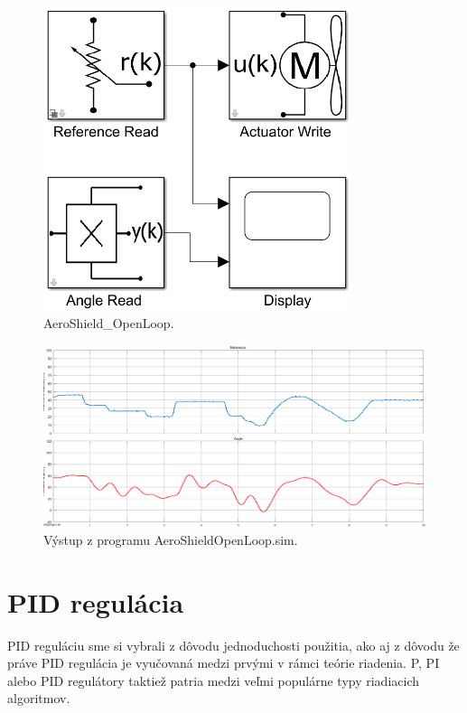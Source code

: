 \begin{figure}[!tbh]
	\centering
	\includegraphics[width=90mm]{obr/AeroOpenLoop.png}
	\caption{AeroShield\_OpenLoop.}\label{OBRAZOK 2.6.111}
\end{figure}

\begin{figure}[!tbh]
	\centering
	\includegraphics[width=120mm]{obr/SSmulinkOpenloop.png}
	\caption{Výstup z programu AeroShieldOpenLoop.sim.}\label{OBRAZOK 3.22}
\end{figure}



\chapter{PID regulácia}
\label{PIDPID}

PID reguláciu sme si vybrali z dôvodu jednoduchosti použitia, ako aj z dôvodu že práve PID regulácia je vyučovaná medzi prvými v rámci teórie riadenia. P, PI alebo PID regulátory taktiež patria medzi veľmi populárne typy riadiacich algoritmov.  

